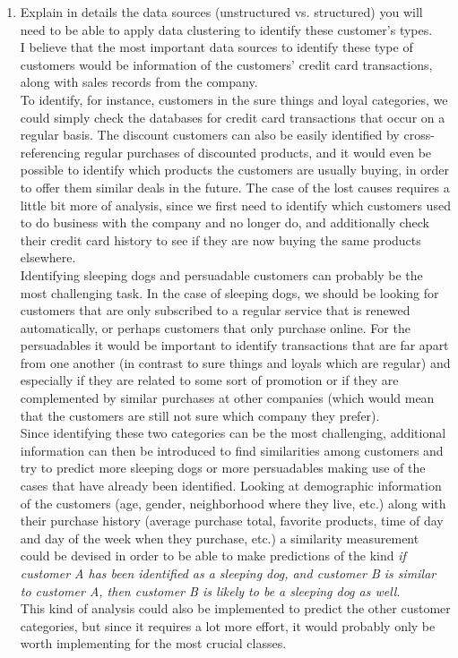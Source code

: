 \documentclass{article}
\begin{document}
\begin{enumerate}[label=(\alph*)]
\begin{enumerate}[label=\arabic*.]
            \item Explain in details the data sources (unstructured vs. structured) you will need to be able to apply data clustering to identify these customer’s types.\\
\newline
I believe that the most important data sources to identify these type of customers would be information of the customers' credit card transactions, along with sales records from the company.\\
To identify, for instance, customers in the sure things and loyal categories, we could simply check the databases for credit card transactions that occur on a regular basis. The discount customers can also be easily identified by cross-referencing regular purchases of discounted products, and it would even be possible to identify which products the customers are usually buying, in order to offer them similar deals in the future. The case of the lost causes requires a little bit more of analysis, since we first need to identify which customers used to do business with the company and no longer do, and additionally check their credit card history to see if they are now buying the same products elsewhere.\\
Identifying sleeping dogs and persuadable customers can probably be the most challenging task. In the case of sleeping dogs, we should be looking for customers that are only subscribed to a regular service that is renewed automatically, or perhaps customers that only purchase online. For the persuadables it would be important to identify transactions that are far apart from one another (in contrast to sure things and loyals which are regular) and especially if they are related to some sort of promotion or if they are complemented by similar purchases at other companies (which would mean that the customers are still not sure which company they prefer).\\
Since identifying these two categories can be the most challenging, additional information can then be introduced to find similarities among customers and try to predict more sleeping dogs or more persuadables making use of the cases that have already been identified. Looking at demographic information of the customers (age, gender, neighborhood where they live, etc.) along with their purchase history (average purchase total, favorite products, time of day and day of the week when they purchase, etc.) a similarity measurement could be devised in order to be able to make predictions of the kind \emph{if customer A has been identified as a sleeping dog, and customer B is similar to customer A, then customer B is likely to be a sleeping dog as well}.\\
This kind of analysis could also be implemented to predict the other customer categories, but since it requires a lot more effort, it would probably only be worth implementing for the most crucial classes.
\newline


\end{enumerate}
\end{enumerate}
\end{document}
